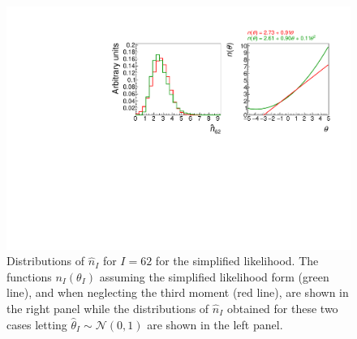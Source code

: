 \documentclass[11pt]{article}
\begin{document}
\begin{figure}[t]
  \centering
  \includegraphics[width=\textwidth]{figures/compare_62}
  \caption{Distributions of $\hat{n}_{I}$ for $I=62$ for the simplified likelihood.
    The functions $n_{I}(\theta_{I})$ assuming the simplified likelihood form (green line),
    and when neglecting the third moment (red line), are shown in the right panel while the distributions
    of $\hat{n}_{I}$ obtained for these two cases letting $\hat{\theta}_{I}\sim\mathcal{N}(0,1)$ are shown in the
    left panel.  }
  \label{fig:distributions}
\end{figure}





\end{document}
